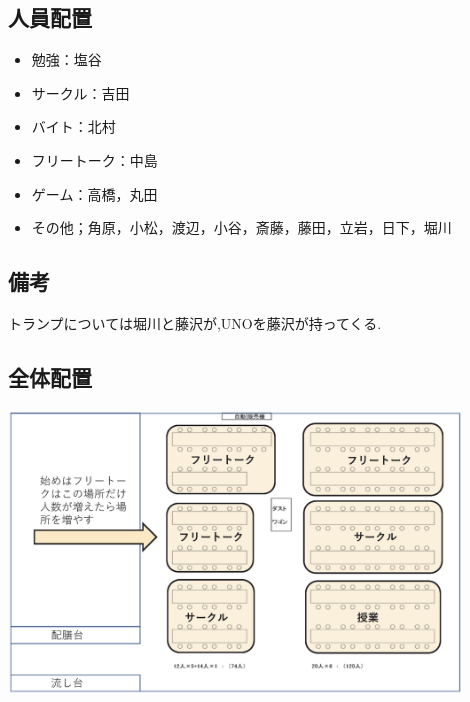 \subsection{人員配置}
\begin{itemize}
\item 勉強：塩谷
\item サークル：吉田
\item バイト：北村
\item フリートーク：中島
\item ゲーム：高橋，丸田
\item その他；角原，小松，渡辺，小谷，斎藤，藤田，立岩，日下，堀川
\end{itemize}
\subsection{備考}
トランプについては堀川と藤沢が,UNOを藤沢が持ってくる.
\subsection{全体配置}
\begin{center}
\includegraphics[width=12cm]{./13/hone.eps}
\end{center}
